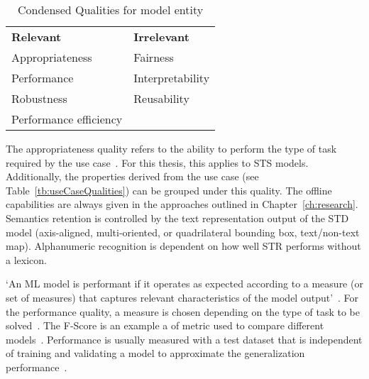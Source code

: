 \begin{table}[h]
    \centering\scriptsize
    \begin{tabular}{l l}
        \textbf{Relevant}                & \textbf{Irrelevant} \\
        Appropriateness         & Fairness  \\
        Performance             & Interpretability \\
        Robustness              & Reusability \\
        Performance efficiency  & \\
    \end{tabular}
    \caption{Condensed Qualities for model entity\label{tb:condensedQualities}}
\end{table}

The appropriateness quality refers to the ability to perform the type of task required by
the use case~\citep{siebert_construction_2021,nakamichi_requirements-driven_2020}.
For this thesis, this applies to \ac{STS} models.
Additionally, the properties derived from the use case (see
Table~\ref{tb:useCaseQualities}) can be grouped under this quality.
The offline capabilities are always given in the approaches outlined in Chapter~\ref{ch:research}.
Semantics retention is controlled by the text representation output of the \ac{STD} model (axis-aligned,
multi-oriented, or quadrilateral bounding box, text/non-text map).
Alphanumeric recognition is dependent on how well \ac{STR} performs without a lexicon.

`An ML model is performant if it operates as expected according to a measure (or set of measures)
that captures relevant characteristics of the model output'~\citep{ashmore_assuring_2021}.
For the performance quality, a measure is chosen depending on the type of task to be
solved~\citep{siebert_construction_2021}.
The F-Score is an example a of metric used to compare different
models~\citep{chen_text_2021, long_scene_2021}.
Performance is usually measured with a test dataset that is independent of training and validating
a model to approximate the generalization performance~\citep{goodfellow_deep_2016,
nakamichi_requirements-driven_2020}.

